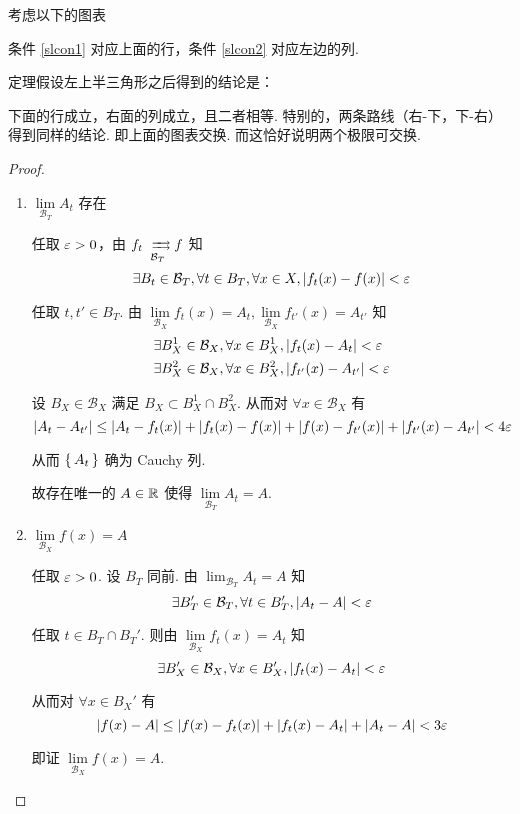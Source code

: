 考虑以下的图表

\begin{center}
    \begin{adjustbox}{scale=1.5}
    \end{adjustbox}
\end{center}

条件 \ref{slcon1} 对应上面的行，条件 \ref{slcon2} 对应左边的列.

定理假设左上半三角形之后得到的结论是：

下面的行成立，右面的列成立，且二者相等. 特别的，两条路线（右-下，下-右）得到同样的结论. 即上面的图表交换. 而这恰好说明两个极限可交换.

\begin{proof}
    \begin{enumerate}
        \item $\lim\limits_{\mathcal{B}_T}A_t$ 存在
        
        任取 $\varepsilon>0$，由 $f_t\xrightrightarrows[\mathcal{B}_T]{}f$ 知
$$
\exists B_t\in\mathcal{B}_T,\forall t\in B_T,\forall x\in X,\left\lvert{f_t(x)-f(x)}\right\rvert<\varepsilon
$$

        任取 $t,t'\in B_T$. 由 $\lim\limits_{\mathcal{B}_X}f_t(x)=A_t,\lim\limits_{\mathcal{B}_X}f_{t'}(x)=A_{t'}$ 知
$$
\begin{aligned}
    &\exists B_X^1\in\mathcal{B}_X,\forall x\in B_X^1,\left\lvert{f_t(x)-A_t}\right\rvert<\varepsilon\\
    &\exists B_X^2\in\mathcal{B}_X,\forall x\in B_X^2,\left\lvert{f_{t'}(x)-A_{t'}}\right\rvert<\varepsilon
\end{aligned}
$$

        设 $B_X\in\mathcal{B}_X$ 满足 $B_X\subset B_X^1\cap B_X^2$. 从而对 $\forall x\in\mathcal{B}_X$ 有
$$
\left\lvert{A_t-A_{t'}}\right\rvert\le\left\lvert{A_t-f_t(x)}\right\rvert+\left\lvert{f_t(x)-f(x)}\right\rvert+\left\lvert{f(x)-f_{t'}(x)}\right\rvert+\left\lvert{f_{t'}(x)-A_{t'}}\right\rvert<4\varepsilon
$$

        从而 $\set{A_t}$ 确为 Cauchy 列.

        故存在唯一的 $A\in\mathbb{R}$ 使得 $\lim\limits_{\mathcal{B}_T}A_t=A$.

        \item $\lim\limits_{\mathcal{B}_X}f(x)=A$
        
        任取 $\varepsilon>0$. 设 $B_T$ 同前. 由 $\lim_{\mathcal{B}_T}A_t=A$ 知
$$
\exists B_T'\in\mathcal{B}_T,\forall t\in B_T',\left\lvert{A_t-A}\right\rvert<\varepsilon
$$

        任取 $t\in B_T\cap B_T'$. 则由 $\lim\limits_{\mathcal{B}_X}f_t(x)=A_t$ 知
$$
\exists B_X'\in\mathcal{B}_X,\forall x\in B_X',\left\lvert{f_t(x)-A_t}\right\rvert<\varepsilon
$$

        从而对 $\forall x\in B_X'$ 有
$$
\left\lvert{f(x)-A}\right\rvert\le\left\lvert{f(x)-f_t(x)}\right\rvert+\left\lvert{f_t(x)-A_t}\right\rvert+\left\lvert{A_t-A}\right\rvert<3\varepsilon
$$

        即证 $\lim\limits_{\mathcal{B}_X}f(x)=A$.
    \end{enumerate}
\end{proof}

